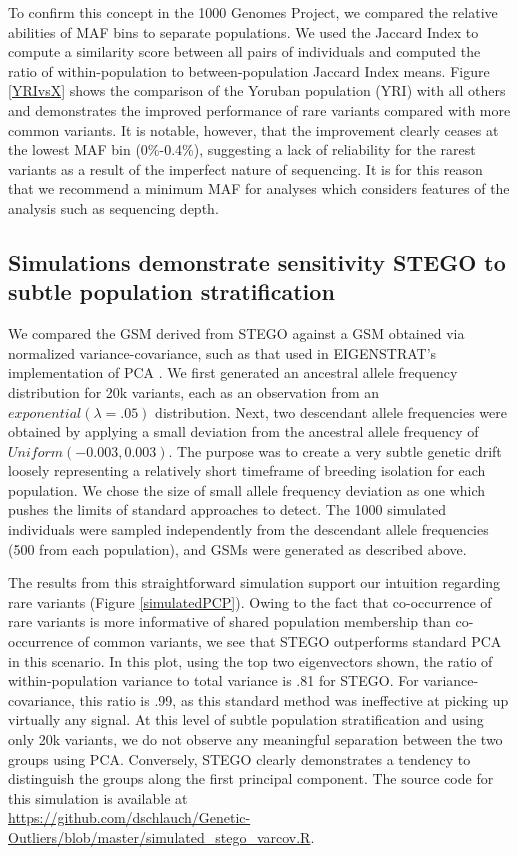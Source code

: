 To confirm this concept in the 1000 Genomes Project, we compared the
relative abilities of MAF bins to separate populations. We used the
Jaccard Index to compute a similarity score between all pairs of individuals
and computed the ratio of within-population to between-population
Jaccard Index means. Figure \ref{YRIvsX} shows the comparison of
the Yoruban population (YRI) with all others and demonstrates the
improved performance of rare variants compared with more common variants.
It is notable, however, that the improvement clearly ceases at the
lowest MAF bin (0\%-0.4\%), suggesting a lack of reliability for the
rarest variants as a result of the imperfect nature of sequencing.
It is for this reason that we recommend a minimum MAF for analyses
which considers features of the analysis such as sequencing depth. 

\subsection{Simulations demonstrate sensitivity STEGO to subtle population stratification}

We compared the GSM derived from STEGO against a GSM obtained via
normalized variance-covariance, such as that used in EIGENSTRAT's
implementation of PCA \cite{price2006principal}. We first generated
an ancestral allele frequency distribution for 20k variants, each
as an observation from an $exponential\left(\lambda=.05\right)$ distribution.
Next, two descendant allele frequencies were obtained by applying
a small deviation from the ancestral allele frequency of $Uniform\left(-0.003,0.003\right)$.
The purpose was to create a very subtle genetic drift loosely representing
a relatively short timeframe of breeding isolation for each population.
We chose the size of small allele frequency deviation as one which
pushes the limits of standard approaches to detect. The 1000 simulated
individuals were sampled independently from the descendant allele
frequencies (500 from each population), and GSMs were generated as
described above.

The results from this straightforward simulation support our intuition
regarding rare variants (Figure \ref{simulatedPCP}).
Owing to the fact that co-occurrence of rare variants is more informative
of shared population membership than co-occurrence of common variants,
we see that STEGO outperforms standard PCA in this scenario. In this
plot, using the top two eigenvectors shown, the ratio of within-population
variance to total variance is .81 for STEGO. For variance-covariance,
this ratio is .99, as this standard method was ineffective at picking
up virtually any signal. At this level of subtle population stratification
and using only 20k variants, we do not observe any meaningful separation
between the two groups using PCA. Conversely, STEGO clearly demonstrates
a tendency to distinguish the groups along the first principal component.
The source code for this simulation is available at \\
\url{https://github.com/dschlauch/Genetic-Outliers/blob/master/simulated_stego_varcov.R}.

